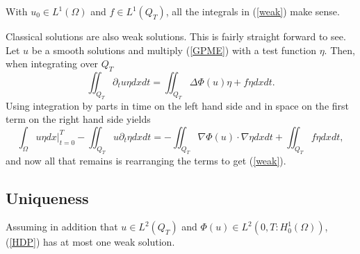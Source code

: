 \documentclass[11pt, a4paper]{article}
\begin{document}
\setcounter{obs}{0}
\begin{obs}
With $u_0 \in L^1(\Omega)$ and $f\in L^1(Q_T)$, all the integrals in (\ref{weak}) make sense.
\end{obs}
\begin{obs}
Classical solutions are also weak solutions. This is fairly straight forward to see. Let $u$ be a smooth solutions and multiply (\ref{GPME}) with a test function $\eta$. Then, when integrating over $Q_T$
\begin{equation*}
\iint_{Q_T}\partial_t u \eta dxdt = \iint_{Q_T}\Delta\Phi(u) \eta + f\eta dxdt.
\end{equation*}
Using integration by parts in time on the left hand side and in space on the first term on the right hand side yields
\begin{equation*}
\int_\Omega u\eta dx \Bigg|_{t=0}^T - \iint_{Q_T}u\partial_t \eta dxdt = -\iint_{Q_T}\nabla \Phi(u) \cdot \nabla \eta dxdt + \iint_{Q_T}f\eta dxdt,
\end{equation*}
and now all that remains is rearranging the terms to get (\ref{weak}).
\end{obs}

\subsection{Uniqueness}

\begin{theorem}[Uniqueness]
\label{thm:uniqueness}
	Assuming in addition that $u \in L^2(Q_T)$ and $\Phi(u) \in L^2(0,T : H_0^1(\Omega))$, (\ref{HDP}) has at most one weak solution.
\end{theorem}
\end{document}
